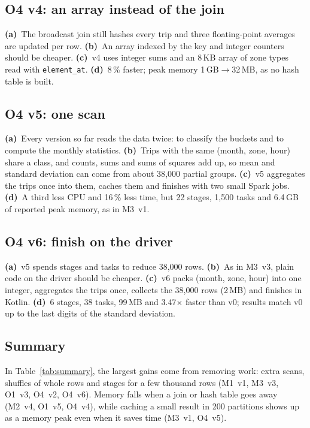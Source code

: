\documentclass[sigconf]{acmart}
\newcommand{\pa}{\textbf{(a)}~}\newcommand{\pb}{\textbf{(b)}~}\newcommand{\pc}{\textbf{(c)}~}\newcommand{\pd}{\textbf{(d)}~}
\begin{document}
\subsection{O4 v4: an array instead of the join}
\pa The broadcast join still hashes every trip and three floating-point averages are updated per row. \pb An array indexed by the key
and integer counters should be cheaper. \pc v4 uses integer sums and an 8\,KB array of zone types read with \texttt{element\_at}.
\pd 8\,\% faster; peak memory 1\,GB$\rightarrow$32\,MB, as no hash table is built.

\subsection{O4 v5: one scan}
\pa Every version so far reads the data twice: to classify the buckets and to compute the monthly statistics. \pb Trips with the same
(month, zone, hour) share a class, and counts, sums and sums of squares add up, so mean and standard deviation can come from about
38{,}000 partial groups. \pc v5 aggregates the trips once into them, caches them and finishes with two small Spark jobs. \pd A third less CPU and 16\,\% less time, but 22 stages, 1{,}500 tasks and 6.4\,GB of reported peak memory, as in M3~v1.

\subsection{O4 v6: finish on the driver}
\pa v5 spends stages and tasks to reduce 38{,}000 rows. \pb As in M3~v3, plain code on the driver should be cheaper. \pc v6 packs
(month, zone, hour) into one integer, aggregates the trips once, collects the 38{,}000 rows (2\,MB) and finishes in Kotlin.
\pd 6 stages, 38 tasks, 99\,MB and 3.47$\times$ faster than v0; results match v0 up to the last digits of the standard deviation.

\subsection{Summary}
In Table~\ref{tab:summary}, the largest gains
come from removing work: extra scans, shuffles of whole rows and stages for a few thousand rows (M1~v1, M3~v3, O1~v3, O4~v2,
O4~v6). Memory falls when a join or hash table goes away (M2~v4, O1~v5, O4~v4), while caching a small result in 200 partitions
shows up as a memory peak even when it saves time (M3~v1, O4~v5). 

\end{document}
